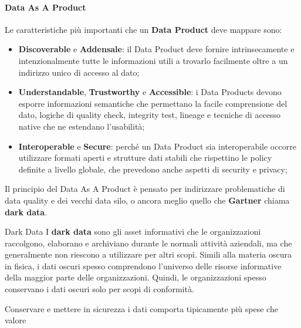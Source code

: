 \paragraph{Data As A Product}\label{par:db_data_as_a_product} %
Le caratteristiche più importanti che un \textbf{Data Product} deve mappare sono:
\begin{itemize}
    \item \textbf{Discoverable} e \textbf{Addensale}: il Data Product deve fornire intrinsecamente e intenzionalmente tutte le informazioni utili a trovarlo facilmente oltre a un indirizzo unico di accesso al dato;
    \item \textbf{Understandable}, \textbf{Trustworthy} e \textbf{Accessible}: i Data Products devono esporre informazioni semantiche che permettano la facile comprensione del dato, logiche di quality check, integrity test, lineage e tecniche di accesso native che ne estendano l'usabilità;
    \item \textbf{Interoperable} e \textbf{Secure}: perché un Data Product sia interoperabile occorre utilizzare formati aperti e strutture dati stabili che rispettino le policy definite a livello globale, che prevedono anche aspetti di security e privacy;
\end{itemize}
\begin{note}
    Il principio del Data As A Product è pensato per indirizzare problematiche di data quality e dei vecchi data silo, o ancora meglio quello che \textbf{Gartner} chiama \textbf{dark data}.
    \begin{definition}{Dark Data}{}
        I \textbf{dark data} sono gli asset informativi che le organizzazioni raccolgono, elaborano e archiviano durante le normali attività aziendali, ma che generalmente non riescono a utilizzare per altri scopi.
        \emptyln{}
        Simili alla materia oscura in fisica, i dati oscuri spesso comprendono l'universo delle risorse informative della maggior parte delle organizzazioni.
        Quindi, le organizzazioni spesso conservano i dati oscuri solo per scopi di conformità.
        \begin{note}
            Conservare e mettere in sicurezza i dati comporta tipicamente più spese che valore
        \end{note}
    \end{definition}
\end{note}
%
